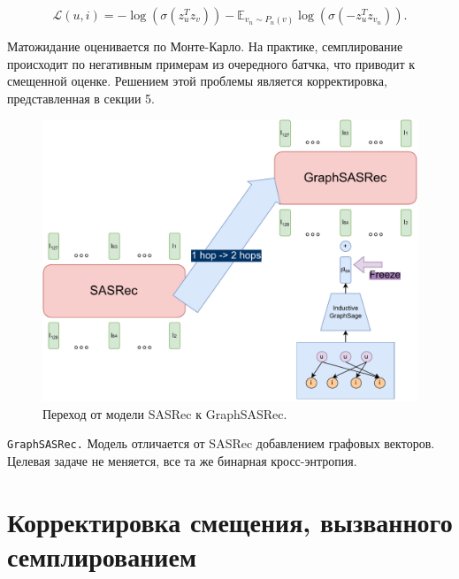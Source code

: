 \documentclass{article}
\begin{document}
$$
\mathcal{L}(u, i) = - \log(\sigma(z_u^T z_v)) - \mathbb{E}_{v_n \sim P_n(v)} \log (\sigma(-z^T_u z_{v_n})).
$$

Матожидание оценивается по Монте-Карло. На практике, семплирование происходит по негативным примерам из очередного батчка, что приводит
к смещенной оценке. Решением этой проблемы является корректировка, представленная в секции 5.

\begin{figure}[!ht]
    \centering
    \includegraphics[width=150mm]{images/grpahsasrec2.pdf}
    \caption{Переход от модели SASRec к GraphSASRec.}
\end{figure}

\texttt{GraphSASRec.} Модель отличается от SASRec добавлением графовых векторов. Целевая задаче не меняется, все та же бинарная кросс-энтропия.

\section{Корректировка смещения, вызванного семплированием}
\end{document}
